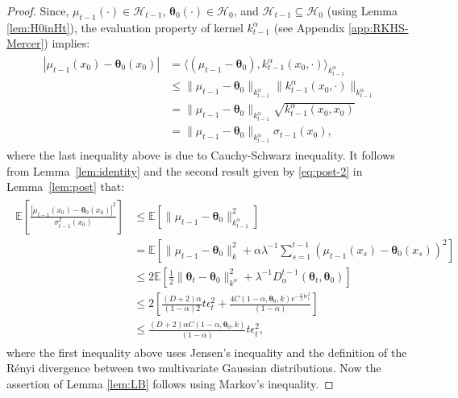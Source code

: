 \documentclass[final,12pt]{colt2026} %
\begin{document}
\begin{proof}
Since, $\mu_{t-1}(\cdot) \in \mathcal{H}_{t-1}$, $\pmb \theta_0(\cdot)\in \mathcal{H}_{0}$, and $\mathcal{H}_{t-1}\subseteq \mathcal{H}_0$ (using Lemma \ref{lem:H0inHt}), the evaluation property of kernel $k_{t-1}^{\alpha}$ (see Appendix \ref{app:RKHS-Mercer}) implies:
\begin{align}\label{eq:GD1}
\begin{split}
    | \mu_{t-1}(x_0) -   \pmb \theta_0(x_0)| &= \langle ( \mu_{t-1}-\pmb \theta_0),k_{t-1}^{\alpha}(x_0,\cdot) \rangle_{k_{t-1}^{\alpha}} \\
      &\leq  \|\mu_{t-1}-\pmb \theta_0\|_{k_{t-1}^{\alpha}}  \|k_{t-1}^{\alpha}(x_0,\cdot)\|_{k_{t-1}^{\alpha}}
     \\
     &=\|\mu_{t-1}-\pmb \theta_0\|_{k_{t-1}^{\alpha}} \sqrt{k_{t-1}^{\alpha}(x_0,x
     _0)} 
     \\
     &=\|\mu_{t-1}-\pmb \theta_0\|_{k_{t-1}^{\alpha}} \sigma_{t-1}(x_0),
\end{split}
\end{align}
where the last inequality above is due to Cauchy-Schwarz inequality. It follows from Lemma~\ref{lem:identity} and the second result given by \eqref{eq:post-2} in Lemma~\ref{lem:post} that:
\begin{align}
\nonumber
\begin{split}
    \mathbb{E}\left[\frac{ |\mu_{t-1}(x_0) -   \pmb \theta_0(x_0)|^2}{\sigma_{t-1}^2(x_0)}\right] &\leq \mathbb{E} \left[\|\mu_{t-1}-\pmb \theta_0 \|_{k_{t-1}^{\alpha}}^2 \right]\\ 
    &=  \mathbb{E} \left[\|\mu_{t-1}-\pmb \theta_0\|_{k}^2 +\alpha\lambda^{-1} \sum_{s=1}^{t-1}(\mu_{t-1}(x_s)-\pmb \theta_0(x_s))^2  \right]
    \\
    &\leq 2 \mathbb{E} \left[\frac{1}{2} \|\pmb \theta_t -\pmb \theta_0\|_{k^\alpha}^2 +  \lambda^{-1} D_{\alpha}^{t-1}(\pmb \theta_t,\pmb \theta_0)  \right]
    \\
    &\leq 2  \left[\frac{(D+2)\alpha}{(1-\alpha)2} t\epsilon_t^2 + \frac{4C(1-\alpha,\pmb\theta_0,k) e^{ - \frac{\alpha}{4}  t\epsilon_t^2 } }{(1-\alpha)} \right]
    \\
    &\leq  \frac{(D+2)\alpha C(1-\alpha,\pmb\theta_0,k)}{ (1-\alpha)}    t\epsilon_t^2
,
\end{split}
\end{align}
where the first inequality above uses Jensen's inequality and the definition of the R\'enyi divergence between two multivariate Gaussian distributions. Now the assertion of Lemma \ref{lem:LB} follows using Markov's inequality.
\end{proof}
\end{document}
